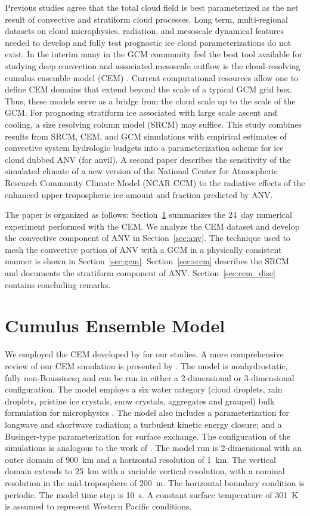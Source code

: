 \documentclass[twoside,agums]{aguplus}
\begin{document}
Previous studies \cite[]{Sli87,Sun88,XuK91} agree that the total 
cloud field is best parameterized as the net result of convective and
stratiform cloud processes.
Long term, multi-regional datasets on cloud microphysics, radiation,
and mesoscale dynamical features needed to develop and fully test 
prognostic ice cloud parameterizations do not exist.
In the interim many in the GCM community feel the best tool available
for studying deep convection and associated mesoscale outflow is the
cloud-resolving cumulus ensemble model (CEM) \cite[]{Bro94}.
Current computational resources allow one to define CEM domains 
that extend beyond the scale of a typical GCM grid box. 
Thus, these models serve as a bridge from the cloud scale up to the
scale of the GCM. 
For prognosing stratiform ice associated with large scale ascent and
cooling, a size resolving column model (SRCM) may suffice.
This study combines results from SRCM, CEM, and GCM simulations
with empirical estimates of convective system hydrologic budgets
into a parameterization scheme for ice cloud dubbed ANV (for anvil).  
A second paper \cite[]{ZeK962} describes the sensitivity of the
simulated climate of a new version of the National Center for
Atmospheric Research Community Climate Model (NCAR CCM) to the
radiative effects of the enhanced upper tropospheric ice amount and
fraction predicted by ANV.  

The paper is organized as follows: Section~\ref{sec:cem} summarizes
the 24~day numerical experiment performed with the CEM.
We analyze the CEM dataset and develop the convective component of ANV
in Section~\ref{sec:anv}.
The technique used to mesh the convective portion of ANV with a GCM in
a physically consistent manner is shown in Section~\ref{sec:gcm}. 
Section~\ref{sec:srcm} describes the SRCM and documents the stratiform
component of ANV.
Section~\ref{sec:cem_disc} contains concluding remarks.

\section{Cumulus Ensemble Model}\label{sec:cem}

We employed the CEM developed by \cite{Tri92} for our studies.
A more comprehensive review of our CEM simulation is presented by
\cite{GMK95}.
The model is nonhydrostatic, fully non-Boussinesq and can be run in
either a 2-dimensional or 3-dimensional configuration.
The model employs a six water category (cloud droplets, rain droplets, 
pristine ice crystals, snow crystals, aggregates and graupel) bulk
formulation for microphysics \cite[]{FTV89}.
The model also includes a parameterization for longwave and shortwave
radiation; a turbulent kinetic energy closure; and a Businger-type
parameterization for surface exchange.
The configuration of the simulations is analogous to the work of
\cite{SLT94}.
The model run is 2-dimensional with an outer domain of 900~km and a
horizontal resolution of 1~km. 
The vertical domain extends to 25~km with a variable vertical
resolution, with a nominal resolution in the mid-troposphere of 200~m.
The horizontal boundary condition is periodic.
The model time step is 10~s.
A constant surface temperature of 301~\dgr K is assumed to represent 
Western Pacific conditions.
\end{document}
